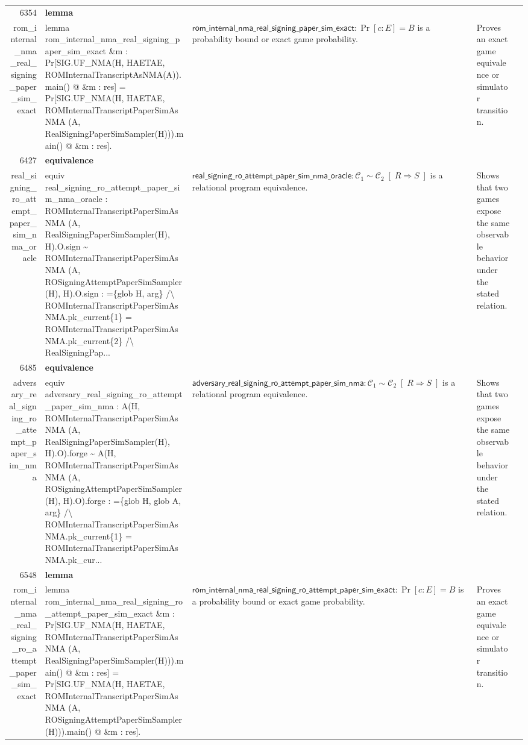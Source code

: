 \documentclass[10pt]{article}
\newcommand{\ec}[1]{\begingroup\ttfamily\scriptsize #1\endgroup}
\begin{document}
\begin{longtable}{r L{0.17\textwidth} L{0.26\textwidth} L{0.27\textwidth} L{0.20\textwidth}}
6354 & \textbf{lemma}\\\ec{rom\_internal\_nma\_real\_signing\_paper\_sim\_exact} & \ec{lemma rom\_internal\_nma\_real\_signing\_paper\_sim\_exact \&m : Pr[SIG.UF\_NMA(H, HAETAE, ROMInternalTranscriptAsNMA(A)).main() @ \&m : res] = Pr[SIG.UF\_NMA(H, HAETAE, ROMInternalTranscriptPaperSimAsNMA (A, RealSigningPaperSimSampler(H))).main() @ \&m : res].} & \(\mathsf{rom\_internal\_nma\_real\_signing\_paper\_sim\_exact} : \Pr[c : E] = B\) is a probability bound or exact game probability. & Proves an exact game equivalence or simulator transition. \\
6427 & \textbf{equivalence}\\\ec{real\_signing\_ro\_attempt\_paper\_sim\_nma\_oracle} & \ec{equiv real\_signing\_ro\_attempt\_paper\_sim\_nma\_oracle : ROMInternalTranscriptPaperSimAsNMA (A, RealSigningPaperSimSampler(H), H).O.sign \textasciitilde{} ROMInternalTranscriptPaperSimAsNMA (A, ROSigningAttemptPaperSimSampler(H), H).O.sign : =\{glob H, arg\} /\textbackslash{} ROMInternalTranscriptPaperSimAsNMA.pk\_current\{1\} = ROMInternalTranscriptPaperSimAsNMA.pk\_current\{2\} /\textbackslash{} RealSigningPap...} & \(\mathsf{real\_signing\_ro\_attempt\_paper\_sim\_nma\_oracle} : \mathcal{C}_1 \sim \mathcal{C}_2 \;[\;R \Rightarrow S\;]\) is a relational program equivalence. & Shows that two games expose the same observable behavior under the stated relation. \\
6485 & \textbf{equivalence}\\\ec{adversary\_real\_signing\_ro\_attempt\_paper\_sim\_nma} & \ec{equiv adversary\_real\_signing\_ro\_attempt\_paper\_sim\_nma : A(H, ROMInternalTranscriptPaperSimAsNMA (A, RealSigningPaperSimSampler(H), H).O).forge \textasciitilde{} A(H, ROMInternalTranscriptPaperSimAsNMA (A, ROSigningAttemptPaperSimSampler(H), H).O).forge : =\{glob H, glob A, arg\} /\textbackslash{} ROMInternalTranscriptPaperSimAsNMA.pk\_current\{1\} = ROMInternalTranscriptPaperSimAsNMA.pk\_cur...} & \(\mathsf{adversary\_real\_signing\_ro\_attempt\_paper\_sim\_nma} : \mathcal{C}_1 \sim \mathcal{C}_2 \;[\;R \Rightarrow S\;]\) is a relational program equivalence. & Shows that two games expose the same observable behavior under the stated relation. \\
6548 & \textbf{lemma}\\\ec{rom\_internal\_nma\_real\_signing\_ro\_attempt\_paper\_sim\_exact} & \ec{lemma rom\_internal\_nma\_real\_signing\_ro\_attempt\_paper\_sim\_exact \&m : Pr[SIG.UF\_NMA(H, HAETAE, ROMInternalTranscriptPaperSimAsNMA (A, RealSigningPaperSimSampler(H))).main() @ \&m : res] = Pr[SIG.UF\_NMA(H, HAETAE, ROMInternalTranscriptPaperSimAsNMA (A, ROSigningAttemptPaperSimSampler(H))).main() @ \&m : res].} & \(\mathsf{rom\_internal\_nma\_real\_signing\_ro\_attempt\_paper\_sim\_exact} : \Pr[c : E] = B\) is a probability bound or exact game probability. & Proves an exact game equivalence or simulator transition. \\

\end{longtable}
\end{document}
